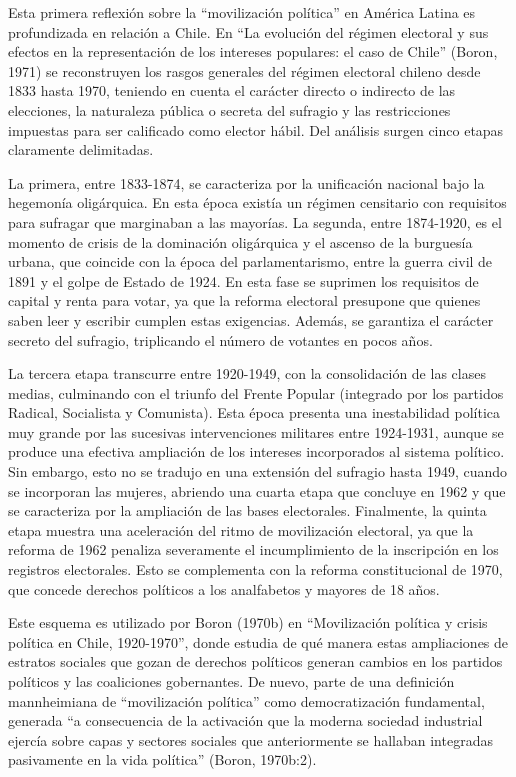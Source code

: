 Esta primera reflexión sobre la \enquote{movilización política} en América Latina es profundizada en relación a Chile. En \enquote{La evolución del régimen electoral y sus efectos en la representación de los intereses populares: el caso de Chile} (Boron, 1971) se reconstruyen los rasgos generales del régimen electoral chileno desde 1833 hasta 1970, teniendo en cuenta el carácter directo o indirecto de las elecciones, la naturaleza pública o secreta del sufragio y las restricciones impuestas para ser calificado como elector hábil. Del análisis surgen cinco etapas claramente delimitadas.

La primera, entre 1833-1874, se caracteriza por la unificación nacional bajo la hegemonía oligárquica. En esta época existía un régimen censitario con requisitos para sufragar que marginaban a las mayorías. La segunda, entre 1874-1920, es el momento de crisis de la dominación oligárquica y el ascenso de la burguesía urbana, que coincide con la época del parlamentarismo, entre la guerra civil de 1891 y el golpe de Estado de 1924. En esta fase se suprimen los requisitos de capital y renta para votar, ya que la reforma electoral presupone que quienes saben leer y escribir cumplen estas exigencias. Además, se garantiza el carácter secreto del sufragio, triplicando el número de votantes en pocos años.

La tercera etapa transcurre entre 1920-1949, con la consolidación de las clases medias, culminando con el triunfo del Frente Popular (integrado por los partidos Radical, Socialista y Comunista). Esta época presenta una inestabilidad política muy grande por las sucesivas intervenciones militares entre 1924-1931, aunque se produce una efectiva ampliación de los intereses incorporados al sistema político. Sin embargo, esto no se tradujo en una extensión del sufragio hasta 1949, cuando se incorporan las mujeres, abriendo una cuarta etapa que concluye en 1962 y que se caracteriza por la ampliación de las bases electorales. Finalmente, la quinta etapa muestra una aceleración del ritmo de movilización electoral, ya que la reforma de 1962 penaliza severamente el incumplimiento de la inscripción en los registros electorales. Esto se complementa con la reforma constitucional de 1970, que concede derechos políticos a los analfabetos y mayores de 18 años.

Este esquema es utilizado por Boron (1970b) en \enquote{Movilización política y crisis política en Chile, 1920-1970}, donde estudia de qué manera estas ampliaciones de estratos sociales que gozan de derechos políticos generan cambios en los partidos políticos y las coaliciones gobernantes. De nuevo, parte de una definición mannheimiana de \enquote{movilización política} como democratización fundamental, generada \enquote{a consecuencia de la activación que la moderna sociedad industrial ejercía sobre capas y sectores sociales que anteriormente se hallaban integradas pasivamente en la vida política} (Boron, 1970b:2).

